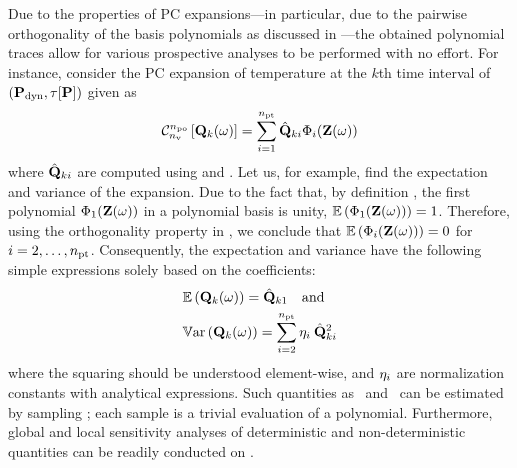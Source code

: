 Due to the properties of PC expansions---in particular, due to the pairwise orthogonality of the basis polynomials as discussed in ---the obtained polynomial traces allow for various prospective analyses to be performed with no effort. For instance, consider the PC expansion of temperature at the $k$th time interval of $\profilePdyn$ given as
\begin{equation} \elabel{pc-k}
  \oPC{\nvars}{\pcorder}{\vTO_k(\o)} = \sum_{i = 1}^{\pcterms} \pcc{\vTO}_{ki} \pcb_i(\vZ(\o))
\end{equation}
where $\hat{\mathbf{Q}}_{ki}$ are computed using  and . Let us, for example, find the expectation and variance of the expansion.
Due to the fact that, by definition \cite{xiu2010}, the first polynomial $\Phi_1(\mathbf{Z}(\omega))$ in a polynomial basis is unity, $\mathbb{E}\left(\Phi_1(\mathbf{Z}(\omega))\right) = 1$.
Therefore, using the orthogonality property in , we conclude that $\mathbb{E}\left(\Phi_i(\mathbf{Z}(\omega))\right) = 0$ for $i = 2, \dotsc, {n_\text{pt}}$.
Consequently, the expectation and variance have the following simple expressions solely based on the coefficients:
\begin{equation} \elabel{pc-moments}
\begin{aligned}
  & \oExp{\vTO_k(\o)} = \pcc{\vTO}_{k1} \hspace{1em} \text{and} \\
  & \oVar{\vTO_k(\o)} = \sum_{i = 2}^{\pcterms} \pcn_i \: \pcc{\vTO}_{ki}^2
\end{aligned}
\end{equation}
where the squaring should be understood element-wise, and $\eta_i$ are normalization constants with analytical expressions. Such quantities as \cdfs\ and \pdfs\ can be estimated by sampling ; each sample is a trivial evaluation of a polynomial. Furthermore, global and local sensitivity analyses of deterministic and non-deterministic quantities can be readily conducted on .
